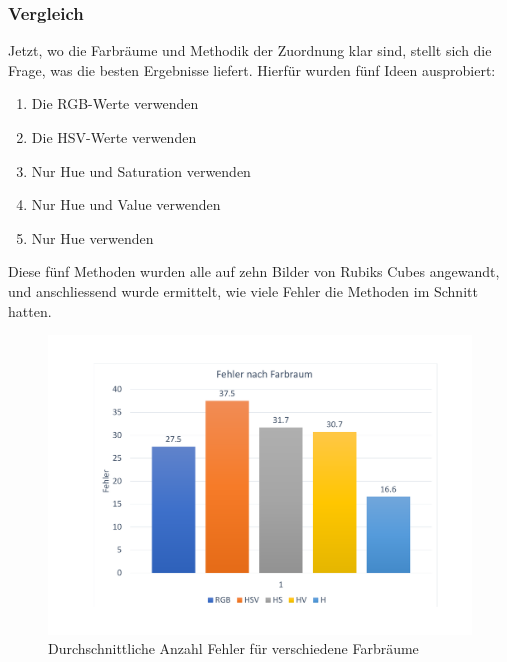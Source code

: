 \documentclass[a4paper, 12pt]{article}
\begin{document}
\subsubsection{Vergleich}
Jetzt, wo die Farbräume und Methodik der Zuordnung klar sind, stellt sich die Frage, was die besten Ergebnisse liefert. Hierfür wurden fünf Ideen ausprobiert:
\begin{enumerate}
  \item Die RGB-Werte verwenden
  \item Die HSV-Werte verwenden
  \item Nur Hue und Saturation verwenden
  \item Nur Hue und Value verwenden
  \item Nur Hue verwenden
\end{enumerate}
Diese fünf Methoden wurden alle auf zehn Bilder von Rubiks Cubes angewandt, und anschliessend wurde ermittelt, wie viele Fehler die Methoden im Schnitt hatten. 
\begin{figure}[H]
\includegraphics[scale=0.4]{Fehler_nach_Methode}
\caption{Durchschnittliche Anzahl Fehler für verschiedene Farbräume}
\end{figure}
\end{document}
